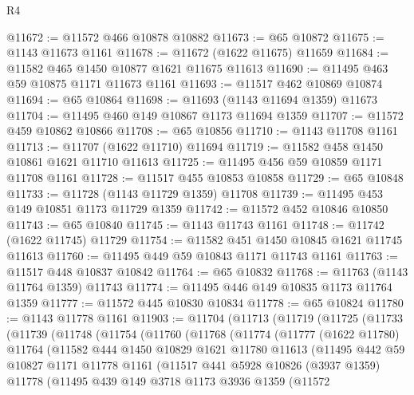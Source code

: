 \begin{lexlean}{R4}
\begin{coremodule}
@11672 := @11572 @466 @10878 @10882
@11673 := @65 @10872
@11675 := @1143 @11673 @1161
@11678 := @11672 (@1622 @11675) @11659
@11684 := @11582 @465 @1450 @10877 @1621 @11675 @11613
@11690 := @11495 @463 @59 @10875 @1171 @11673 @1161
@11693 := @11517 @462 @10869 @10874
@11694 := @65 @10864
@11698 := @11693 (@1143 @11694 @1359) @11673
@11704 := @11495 @460 @149 @10867 @1173 @11694 @1359
@11707 := @11572 @459 @10862 @10866
@11708 := @65 @10856
@11710 := @1143 @11708 @1161
@11713 := @11707 (@1622 @11710) @11694
@11719 := @11582 @458 @1450 @10861 @1621 @11710 @11613
@11725 := @11495 @456 @59 @10859 @1171 @11708 @1161
@11728 := @11517 @455 @10853 @10858
@11729 := @65 @10848
@11733 := @11728 (@1143 @11729 @1359) @11708
@11739 := @11495 @453 @149 @10851 @1173 @11729 @1359
@11742 := @11572 @452 @10846 @10850
@11743 := @65 @10840
@11745 := @1143 @11743 @1161
@11748 := @11742 (@1622 @11745) @11729
@11754 := @11582 @451 @1450 @10845 @1621 @11745 @11613
@11760 := @11495 @449 @59 @10843 @1171 @11743 @1161
@11763 := @11517 @448 @10837 @10842
@11764 := @65 @10832
@11768 := @11763 (@1143 @11764 @1359) @11743
@11774 := @11495 @446 @149 @10835 @1173 @11764 @1359
@11777 := @11572 @445 @10830 @10834
@11778 := @65 @10824
@11780 := @1143 @11778 @1161
@11903 := @11704
    (@11713
      (@11719
        (@11725
          (@11733
            (@11739
              (@11748
                (@11754
                  (@11760
                    (@11768
                      (@11774
                        (@11777
                          (@1622 @11780)
                          @11764
                          (@11582
                            @444
                            @1450
                            @10829
                            @1621
                            @11780
                            @11613
                            (@11495
                              @442
                              @59
                              @10827
                              @1171
                              @11778
                              @1161
                              (@11517
                                @441
                                @5928
                                @10826
                                (@3937 @1359)
                                @11778
                                (@11495
                                  @439
                                  @149
                                  @3718
                                  @1173
                                  @3936
                                  @1359
                                  (@11572

\end{coremodule}
\end{lexlean}
